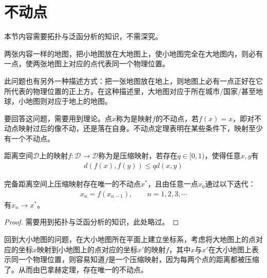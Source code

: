 
\section{不动点}
\label{sec:fixed-point}

本节内容需要拓扑与泛函分析的知识，不需深究。

\begin{example}
  两张内容一样的地图，把小地图放在大地图上，使小地图完全在大地图内，则必有一点，使两张地图上对应的点代表同一个物理位置。
\end{example}

此问题也有另外一种描述方式：把一张地图放在地上，则地图上必有一点正好在它所代表的物理位置的正上方。在这种描述里，大地图对应于所在城市/国家/甚至地球，小地图则对应于地上的地图。

要回答这问题，需要用到理论。点$x$称为是映射$f$的不动点，若$f(x)=x$，即对不动点映射过后的像不动，还是落在自身。不动点定理表明在某些条件下，映射至少有一个不动点。

\begin{definition}[压缩映射]
  距离空间$\mathcal{D}$上的映射$f:\mathcal{D}\to\mathcal{D}$称为是压缩映射，若存在$q\in[0,1)$，使得任意$x,y$有
  \begin{align}
    d(f(x),f(y))\le q d(x,y)
  \end{align}
\end{definition}

\begin{theorem}
  完备距离空间上压缩映射存在唯一的不动点$x^*$，且由任意一点$x_0$通过以下迭代：
  \begin{align*}
    x_{n}=f(x_{n-1}),\quad\quad n=1,2,3,\cdots
  \end{align*}
  有$x_n\to x^*$。
\end{theorem}
\begin{proof}
  需要用到拓扑与泛函分析的知识，此处略过。
\end{proof}

回到大小地图的问题，在大小地图所在平面上建立坐标系，考虑将大地图上的点对应的坐标$x$映射到小地图上的点对应的坐标$x'$的映射$f$，其中$x$与$x'$在大小地图上表示同一个物理位置，则容易知道$f$是一个压缩映射，因为每两个点的距离都被压缩了。从而由巴拿赫定理，存在唯一的不动点。
